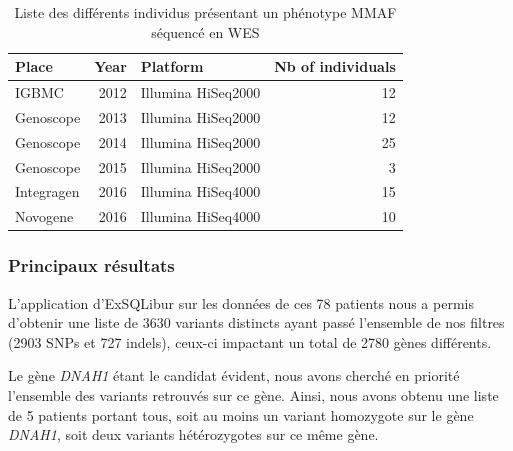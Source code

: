 \documentclass[12pt,a4paper,twoside]{ugathesis}
\theoremstyle{definition}
\theoremstyle{definition}
\theoremstyle{definition}
\theoremstyle{remark}
\begin{document}
\begin{longtable}[t]{lrlr}
\caption{\label{tab:tabrunbigmmaf}Liste des différents individus présentant un phénotype MMAF séquencé en WES}\\
\toprule
Place & Year & Platform & Nb of individuals\\
\midrule
IGBMC & 2012 & Illumina HiSeq2000 & 12\\
Genoscope & 2013 & Illumina HiSeq2000 & 12\\
Genoscope & 2014 & Illumina HiSeq2000 & 25\\
Genoscope & 2015 & Illumina HiSeq2000 & 3\\
Integragen & 2016 & Illumina HiSeq4000 & 15\\
Novogene & 2016 & Illumina HiSeq4000 & 10\\
\bottomrule
\end{longtable}



\newpage

\subsubsection{Principaux résultats}\label{principaux-resultats-4}

L'application d'ExSQLibur sur les données de ces 78 patients nous a
permis d'obtenir une liste de 3630 variants distincts ayant passé
l'ensemble de nos filtres (2903 SNPs et 727 indels), ceux-ci impactant
un total de 2780 gènes différents.

Le gène \emph{DNAH1} étant le candidat évident, nous avons cherché en
priorité l'ensemble des variants retrouvés sur ce gène. Ainsi, nous
avons obtenu une liste de 5 patients portant tous, soit au moins un
variant homozygote sur le gène \emph{DNAH1}, soit deux variants
hétérozygotes sur ce même gène.
\end{document}
